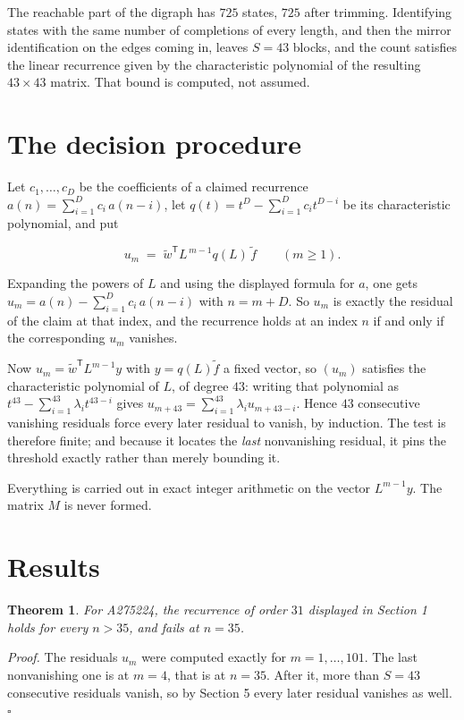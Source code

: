 \documentclass[11pt]{article}
\newtheorem{theorem}{Theorem}
\theoremstyle{definition}
\begin{document}
The reachable part of the digraph has $725$ states, $725$ after trimming. Identifying states with the same number of completions of every length, and then the mirror identification on the edges coming in, leaves $S = 43$ blocks, and the count satisfies the linear recurrence given by the characteristic polynomial of the resulting $43\times43$ matrix. That bound is computed, not assumed.

\section{The decision procedure}

Let $c_1,\dots,c_D$ be the coefficients of a claimed recurrence $a(n) = \sum_{i=1}^{D} c_i\,a(n-i)$, let $q(t) = t^{D} - \sum_{i=1}^{D} c_i t^{D-i}$ be its characteristic polynomial, and put

\[u_m \;=\; \tilde w^{\mathsf T} L^{\,m-1} q(L)\,\tilde f \qquad (m \ge 1).\]

Expanding the powers of $L$ and using the displayed formula for $a$, one gets $u_m = a(n) - \sum_{i=1}^{D} c_i\,a(n-i)$ with $n = m + D$. So $u_m$ is exactly the residual of the claim at that index, and the recurrence holds at an index $n$ if and only if the corresponding $u_m$ vanishes.

Now $u_m = \tilde w^{\mathsf T} L^{m-1} y$ with $y = q(L)\tilde f$ a fixed vector, so $(u_m)$ satisfies the characteristic polynomial of $L$, of degree $43$: writing that polynomial as $t^{43} - \sum_{i=1}^{43} \lambda_i t^{43-i}$ gives $u_{m+43} = \sum_{i=1}^{43} \lambda_i u_{m+43-i}$. Hence $43$ consecutive vanishing residuals force every later residual to vanish, by induction. The test is therefore finite; and because it locates the {\itshape last} nonvanishing residual, it pins the threshold exactly rather than merely bounding it.

Everything is carried out in exact integer arithmetic on the vector $L^{m-1}y$. The matrix $M$ is never formed.

\section{Results}

\begin{theorem} For A275224, the recurrence of order $31$ displayed in Section 1 holds for every $n > 35$, and fails at $n = 35$.\end{theorem}

{\itshape Proof.} The residuals $u_m$ were computed exactly for $m = 1,\dots,101$. The last nonvanishing one is at $m = 4$, that is at $n = 35$. After it, more than $S = 43$ consecutive residuals vanish, so by Section 5 every later residual vanishes as well. $\square$
\end{document}
